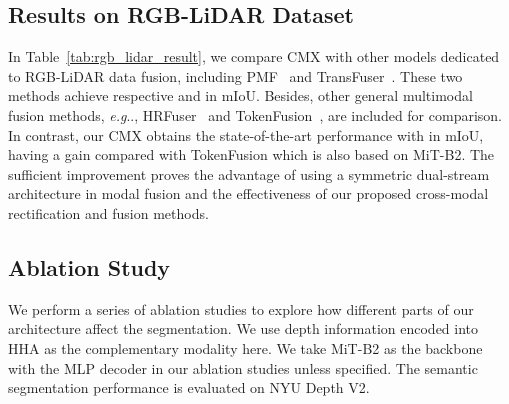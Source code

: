 \documentclass[journal]{IEEEtran}
\makeatletter
\DeclareRobustCommand\onedot{\futurelet\@let@token\@onedot}
\def\@onedot{\ifx\@let@token.\else.\null\fi\xspace}
\def\eg{\emph{e.g}\onedot} \def\Eg{\emph{E.g}\onedot}
\makeatother
\begin{document}
\subsection{Results on RGB-LiDAR Dataset}\label{sec:results_rgbl}
\begin{table}[t]
\centering
\caption{\textsc{Results for RGB-LiDAR segmentation.}}    
\label{tab:rgb_lidar_result}
\end{table} In Table~\ref{tab:rgb_lidar_result}, we compare CMX with other models dedicated to RGB-LiDAR data fusion, including PMF~\cite{zhuang2021pmf} and TransFuser~\cite{prakash2021transfuser}. These two methods achieve respective  and  in mIoU. Besides, other general multimodal fusion methods, \eg, HRFuser~\cite{broedermann2022hrfuser} and TokenFusion~\cite{wang2022tokenfusion}, are included for comparison. In contrast, our CMX obtains the state-of-the-art performance with  in mIoU, having a  gain compared with TokenFusion which is also based on MiT-B2. The sufficient improvement proves the advantage of using a symmetric dual-stream architecture in modal fusion and the effectiveness of our proposed cross-modal rectification and fusion methods.

\subsection{Ablation Study}
\label{sec:ablation_study}
We perform a series of ablation studies to explore how different parts of our architecture affect the segmentation.
We use depth information encoded into HHA as the complementary modality here.
We take MiT-B2 as the backbone with the MLP decoder in our ablation studies unless specified.
The semantic segmentation performance is evaluated on NYU Depth V2.
\end{document}
